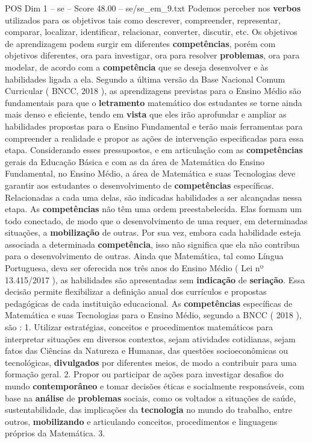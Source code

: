 \begin{textsample}{POS Dim 1 – se – Score 48.00 – se/se\_em\_9.txt}
Podemos perceber nos \textbf{verbos} utilizados para os objetivos tais como descrever, compreender, representar, comparar, localizar, identificar, relacionar, converter, discutir, etc.
Os objetivos de aprendizagem podem surgir em diferentes \textbf{competências}, porém com objetivos diferentes, ora para investigar, ora para resolver \textbf{problemas}, ora para modelar, de acordo com a \textbf{competência} que se deseja desenvolver e às habilidades ligada a ela.
Segundo a última versão da Base Nacional Comum Curricular ( BNCC, 2018 ), as aprendizagens previstas para o Ensino Médio são fundamentais para que o \textbf{letramento} matemático dos estudantes se torne ainda mais denso e eficiente, tendo em \textbf{vista} que eles irão aprofundar e ampliar as habilidades propostas para o Ensino Fundamental e terão mais ferramentas para compreender a realidade e propor as ações de intervenção especificadas para essa etapa.
Considerando esses pressupostos, e em articulação com as \textbf{competências} gerais da Educação Básica e com as da área de Matemática do Ensino Fundamental, no Ensino Médio, a área de Matemática e suas Tecnologias deve garantir aos estudantes o desenvolvimento de \textbf{competências} específicas.
Relacionadas a cada uma delas, são indicadas habilidades a ser alcançadas nessa etapa.
As \textbf{competências} não têm uma ordem preestabelecida.
Elas formam um todo conectado, de modo que o desenvolvimento de uma requer, em determinadas situações, a \textbf{mobilização} de outras.
Por sua vez, embora cada habilidade esteja associada a determinada \textbf{competência}, isso não significa que ela não contribua para o desenvolvimento de outras.
Ainda que Matemática, tal como Língua Portuguesa, deva ser oferecida nos três anos do Ensino Médio ( Lei nº 13.415/2017 ), as habilidades são apresentadas sem \textbf{indicação} de \textbf{seriação}.
Essa decisão permite flexibilizar a definição anual dos currículos e propostas pedagógicas de cada instituição educacional.
As \textbf{competências} específicas de Matemática e suas Tecnologias para o Ensino Médio, segundo a BNCC ( 2018 ), são : 1.
Utilizar estratégias, conceitos e procedimentos matemáticos para interpretar situações em diversos contextos, sejam atividades cotidianas, sejam fatos das Ciências da Natureza e Humanas, das questões socioeconômicas ou tecnológicas, \textbf{divulgados} por diferentes meios, de modo a contribuir para uma formação geral. 2.
Propor ou participar de ações para investigar desafios do mundo \textbf{contemporâneo} e tomar decisões éticas e socialmente responsáveis, com base na \textbf{análise} de \textbf{problemas} sociais, como os voltados a situações de saúde, sustentabilidade, das implicações da \textbf{tecnologia} no mundo do trabalho, entre outros, \textbf{mobilizando} e articulando conceitos, procedimentos e linguagens próprios da Matemática. 3.

\end{textsample}
